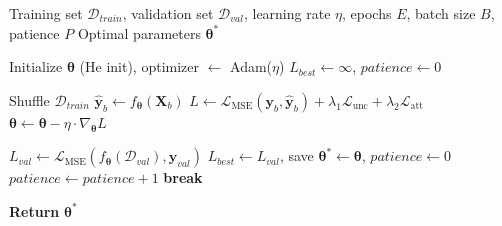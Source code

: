 \begin{algorithm}[H]
\footnotesize
\caption{Model Training Procedure}
\label{alg:model_training}
\begin{algorithmic}
\Require Training set $\mathcal{D}_{train}$, validation set $\mathcal{D}_{val}$, learning rate $\eta$, epochs $E$, batch size $B$, patience $P$
\Ensure Optimal parameters $\boldsymbol{\theta}^*$

\State Initialize $\boldsymbol{\theta}$ (He init), optimizer $\gets$ Adam($\eta$)
\State $L_{best} \gets \infty$, $patience \gets 0$

    \State Shuffle $\mathcal{D}_{train}$
        \State $\hat{\mathbf{y}}_b \gets f_{\boldsymbol{\theta}}(\mathbf{X}_b)$
        \State $L \gets \mathcal{L}_{\text{MSE}}(\mathbf{y}_b, \hat{\mathbf{y}}_b) + \lambda_1 \mathcal{L}_{\text{unc}} + \lambda_2 \mathcal{L}_{\text{att}}$
        \State $\boldsymbol{\theta} \gets \boldsymbol{\theta} - \eta \cdot \nabla_{\boldsymbol{\theta}} L$
    \EndFor
    
    \State $L_{val} \gets \mathcal{L}_{\text{MSE}}(f_{\boldsymbol{\theta}}(\mathcal{D}_{val}), \mathbf{y}_{val})$
        \State $L_{best} \gets L_{val}$, save $\boldsymbol{\theta}^* \gets \boldsymbol{\theta}$, $patience \gets 0$
    \Else
        \State $patience \gets patience + 1$
    \EndIf
     \textbf{break} \EndIf
\EndFor

\State \textbf{Return} $\boldsymbol{\theta}^*$
\end{algorithmic}
\end{algorithm}
